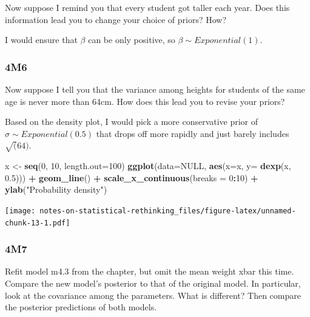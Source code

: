 \documentclass[
]{book}
\newenvironment{Shaded}{\begin{snugshade}}{\end{snugshade}}
\newcommand{\DataTypeTok}[1]{\textcolor[rgb]{0.13,0.29,0.53}{#1}}
\newcommand{\DecValTok}[1]{\textcolor[rgb]{0.00,0.00,0.81}{#1}}
\newcommand{\FloatTok}[1]{\textcolor[rgb]{0.00,0.00,0.81}{#1}}
\newcommand{\KeywordTok}[1]{\textcolor[rgb]{0.13,0.29,0.53}{\textbf{#1}}}
\newcommand{\NormalTok}[1]{#1}
\newcommand{\OperatorTok}[1]{\textcolor[rgb]{0.81,0.36,0.00}{\textbf{#1}}}
\newcommand{\OtherTok}[1]{\textcolor[rgb]{0.56,0.35,0.01}{#1}}
\newcommand{\StringTok}[1]{\textcolor[rgb]{0.31,0.60,0.02}{#1}}
\begin{document}
Now suppose I remind you that every student got taller each year. Does this information lead you to change your choice of priors? How?

I would ensure that \(\beta\) can be only positive, so \(β ∼ Exponential(1)\).

\hypertarget{m6-2}{%
\subsubsection*{4M6}\label{m6-2}}

Now suppose I tell you that the variance among heights for students of the same age is never more than 64cm. How does this lead you to revise your priors?

Based on the density plot, I would pick a more conservative prior of \(\sigma \sim Exponential(0.5)\) that drops off more rapidly and just barely includes \(\sqrt(64)\).

\begin{Shaded}
\begin{Highlighting}[]
\NormalTok{x \textless{}{-}}\StringTok{ }\KeywordTok{seq}\NormalTok{(}\DecValTok{0}\NormalTok{, }\DecValTok{10}\NormalTok{, }\DataTypeTok{length.out=}\DecValTok{100}\NormalTok{)}
\KeywordTok{ggplot}\NormalTok{(}\DataTypeTok{data=}\OtherTok{NULL}\NormalTok{, }\KeywordTok{aes}\NormalTok{(}\DataTypeTok{x=}\NormalTok{x, }\DataTypeTok{y=} \KeywordTok{dexp}\NormalTok{(x, }\FloatTok{0.5}\NormalTok{))) }\OperatorTok{+}\StringTok{ }
\StringTok{  }\KeywordTok{geom\_line}\NormalTok{() }\OperatorTok{+}
\StringTok{  }\KeywordTok{scale\_x\_continuous}\NormalTok{(}\DataTypeTok{breaks =} \DecValTok{0}\OperatorTok{:}\DecValTok{10}\NormalTok{) }\OperatorTok{+}
\StringTok{  }\KeywordTok{ylab}\NormalTok{(}\StringTok{"Probability density"}\NormalTok{)}
\end{Highlighting}
\end{Shaded}

\texttt{[image: notes-on-statistical-rethinking\_files/figure-latex/unnamed-chunk-13-1.pdf]}

\hypertarget{m7-1}{%
\subsubsection*{4M7}\label{m7-1}}

Refit model m4.3 from the chapter, but omit the mean weight xbar this time. Compare the new model's posterior to that of the original model. In particular, look at the covariance among the parameters. What is different? Then compare the posterior predictions of both models.
\end{document}
